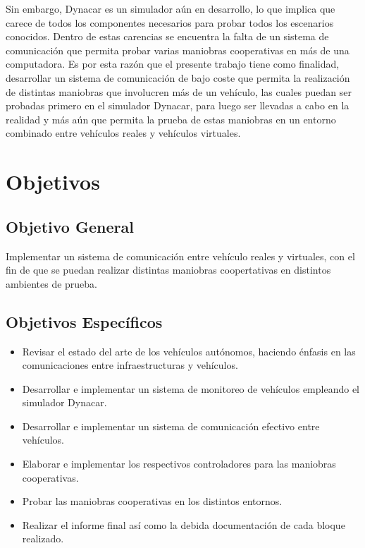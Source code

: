 \par Sin embargo, Dynacar es un simulador aún en desarrollo, lo que implica que carece de todos los componentes necesarios para probar todos los escenarios conocidos. Dentro de estas carencias se encuentra la falta de un sistema de comunicación que permita probar varias maniobras cooperativas en más de una computadora. Es por esta razón que el presente trabajo tiene como finalidad, desarrollar un sistema de comunicación de bajo coste que permita la realización de distintas maniobras que involucren más de un vehículo, las cuales puedan ser probadas primero en el simulador Dynacar, para luego ser llevadas a cabo en la realidad y más aún que permita la prueba de estas maniobras en un entorno combinado entre vehículos reales y vehículos virtuales.       

\section{Objetivos}

\subsection{Objetivo General}

Implementar un sistema de comunicación entre vehículo reales y virtuales, con el fin de que se puedan realizar distintas maniobras coopertativas en distintos ambientes de prueba. 

\subsection{Objetivos Específicos}
\begin{itemize}
	\item Revisar el estado del arte de los vehículos autónomos, haciendo énfasis en las comunicaciones entre infraestructuras y vehículos.
	\item Desarrollar e implementar un sistema de monitoreo de vehículos empleando el simulador Dynacar.
	\item Desarrollar e implementar un sistema de comunicación efectivo entre vehículos.
	\item Elaborar e implementar los respectivos controladores para las maniobras cooperativas.
	\item Probar las maniobras cooperativas en los distintos entornos.
	\item Realizar el informe final así como la debida documentación de cada bloque realizado.
\end{itemize}

